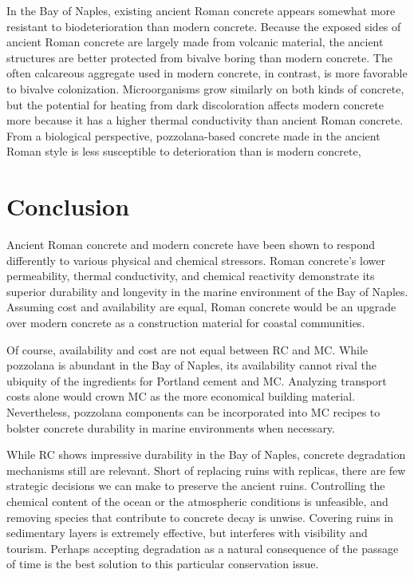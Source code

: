 \documentclass[12pt]{article}
\begin{document}
	In the Bay of Naples, existing ancient Roman concrete appears somewhat more resistant to biodeterioration than modern concrete.  Because the exposed sides of ancient Roman concrete are largely made from volcanic material, the ancient structures are better protected from bivalve boring than modern concrete.  The often calcareous aggregate used in modern concrete, in contrast, is more favorable to bivalve colonization.  Microorganisms grow similarly on both kinds of concrete, but the potential for heating from dark discoloration affects modern concrete more because it has a higher thermal conductivity than ancient Roman concrete.  From a biological perspective, pozzolana-based concrete made in the ancient Roman style is less susceptible to deterioration than is modern concrete,

\section*{Conclusion}

Ancient Roman concrete and modern concrete have been shown to respond differently to various physical and chemical stressors. Roman concrete's lower permeability, thermal conductivity, and chemical reactivity demonstrate its superior durability and longevity in the marine environment of the Bay of Naples. Assuming cost and availability are equal, Roman concrete would be an upgrade over modern concrete as a construction material for coastal communities.

Of course, availability and cost are not equal between RC and MC. While pozzolana is abundant in the Bay of Naples, its availability cannot rival the ubiquity of the ingredients for Portland cement and MC. Analyzing transport costs alone would crown MC as the more economical building material. Nevertheless, pozzolana components can be incorporated into MC recipes to bolster concrete durability in marine environments when necessary.

While RC shows impressive durability in the Bay of Naples, concrete degradation mechanisms still are relevant. Short of replacing ruins with replicas, there are few strategic decisions we can make to preserve the ancient ruins. Controlling the chemical content of the ocean or the atmospheric conditions is unfeasible, and removing species that contribute to concrete decay is unwise. Covering ruins in sedimentary layers is extremely effective, but interferes with visibility and tourism. Perhaps accepting degradation as a natural consequence of the passage of time is the best solution to this particular conservation issue.
\end{document}
